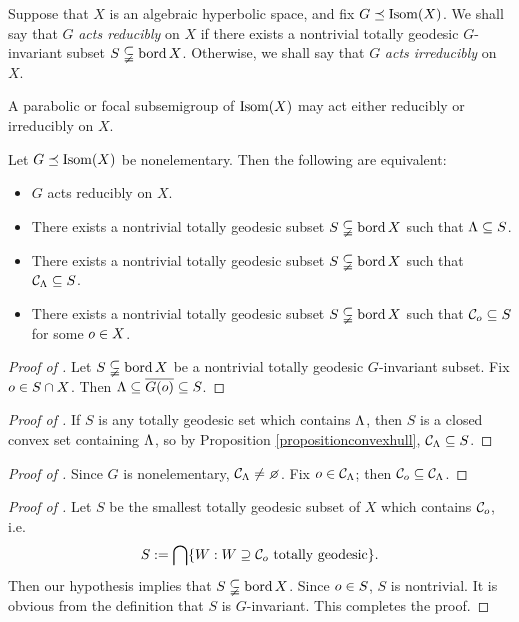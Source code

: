 \begin{definition}
\label{definitionreducibly}
Suppose that $X$ is an algebraic hyperbolic space, and fix $G\preceq\operatorname{Isom}(X)$. We shall say that $G$ \emph{acts reducibly} on $X$ if there exists a nontrivial totally geodesic $G$-invariant subset $S\subsetneqq \operatorname{bord} X$. Otherwise, we shall say that $G$ \emph{acts irreducibly} on $X$.
\end{definition}

\begin{remark}
A parabolic or focal subsemigroup of $\operatorname{Isom}(X)$ may act either reducibly or irreducibly on $X$.
\end{remark}

%
%

\begin{proposition}
\label{propositionactsreducibly}
Let $G\preceq\operatorname{Isom}(X)$ be nonelementary. Then the following are equivalent:
\begin{itemize}
\item[(A)] $G$ acts reducibly on $X$.
\item[(B)] There exists a nontrivial totally geodesic subset $S\subsetneqq \operatorname{bord} X$ such that $\Lambda\subseteq S$.
\item[(C)] There exists a nontrivial totally geodesic subset $S\subsetneqq \operatorname{bord} X$ such that $\mathcal C_\Lambda\subseteq S$.
\item[(D)] There exists a nontrivial totally geodesic subset $S\subsetneqq \operatorname{bord} X$ such that $\mathcal C_o\subseteq S$ for some $o\in X$.
\end{itemize}
\end{proposition}
\begin{proof}[Proof of ]
Let $S\subsetneqq \operatorname{bord} X$ be a nontrivial totally geodesic $G$-invariant subset. Fix $o\in S\cap X$. Then $\Lambda\subseteq\overline{G(o)}\subseteq S$.
\end{proof}
\begin{proof}[Proof of ]
If $S$ is any totally geodesic set which contains $\Lambda$, then $S$ is a closed convex set containing $\Lambda$, so by Proposition \ref{propositionconvexhull}, $\mathcal C_\Lambda\subseteq S$.
\end{proof}
\begin{proof}[Proof of ]
Since $G$ is nonelementary, $\CC_\Lambda \neq \emptyset$. Fix $o\in\mathcal C_\Lambda$; then $\mathcal C_o\subseteq \mathcal C_\Lambda$.
\end{proof}
\begin{proof}[Proof of ]
Let $S$ be the smallest totally geodesic subset of $X$ which contains $\mathcal C_o$, i.e.
\[
S := \bigcap\{W:W\supseteq \mathcal C_o\textup{ totally geodesic}\}.
\]
Then our hypothesis implies that $S\subsetneqq \operatorname{bord} X$. Since $o\in S$, $S$ is nontrivial. It is obvious from the definition that $S$ is $G$-invariant. This completes the proof.
\end{proof}

